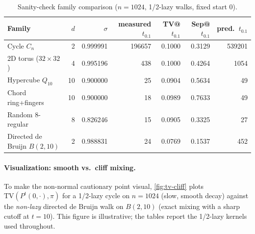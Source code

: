 \documentclass[11pt]{article}
\newcommand{\TV}{\mathrm{TV}}
\begin{document}
\begin{table}[h]
\centering
\small
\setlength{\tabcolsep}{4pt}
\begin{tabular}{lrrrrrr}
\toprule
Family & $d$ & $\sigma$ & measured $t_{0.1}$ & TV@ $t_{0.1}$ & Sep@ $t_{0.1}$ & pred.\ $t_{0.1}$ \\
\midrule
Cycle $C_n$ & 2 & 0.999991 & 196657 & 0.1000 & 0.3129 & 539201 \\
2D torus ($32\times 32$) & 4 & 0.995196 & 438 & 0.1000 & 0.4264 & 1054 \\
Hypercube $Q_{10}$ & 10 & 0.900000 & 25 & 0.0904 & 0.5634 & 49 \\
Chord ring+fingers & 10 & 0.900000 & 18 & 0.0989 & 0.7633 & 49 \\
Random 8-regular & 8 & 0.826246 & 15 & 0.0905 & 0.3325 & 27 \\
Directed de Bruijn $B(2,10)$ & 2 & 0.988831 & 24 & 0.0769 & 0.1537 & 452 \\
\bottomrule
\end{tabular}
\caption{Sanity-check family comparison ($n=1024$, 1/2-lazy walks, fixed start $0$).}
\label{tab:families}
\end{table}

\paragraph{Visualization: smooth vs.\ cliff mixing.}
To make the non-normal cautionary point visual, \cref{fig:tv-cliff} plots
$\TV(P^t(0,\cdot),\pi)$ for a 1/2-lazy cycle on $n=1024$ (slow, smooth decay)
against the \emph{non-lazy} directed de Bruijn walk on $B(2,10)$ (exact mixing
with a sharp cutoff at $t=10$). This figure is illustrative; the tables report
the 1/2-lazy kernels used throughout.
\end{document}
